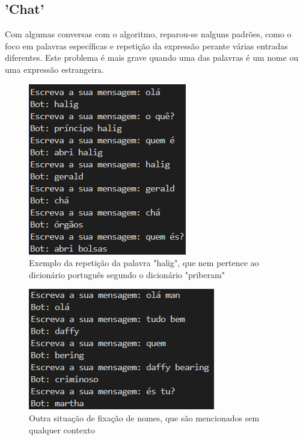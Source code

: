 \documentclass{article}
\begin{document}
\subsection{'Chat'}
Com algumas conversas com o algoritmo, reparou-se nalguns padrões, como o foco em palavras específicas e repetição da expressão perante várias entradas diferentes. Este problema é mais grave quando uma das palavras é um nome ou uma expressão estrangeira. 
\begin{figure}[h]
    \centering
    \includegraphics[scale=0.7]{exemplo_chat.png}
    \caption{Exemplo da repetição da palavra "halig", que nem pertence ao dicionário português segundo o dicionário "priberam"}
    \label{chat1}
\end{figure}
\begin{figure}[h]
    \centering
    \includegraphics[scale=0.7]{chat1}
    \caption{Outra situação de fixação de nomes, que são mencionados sem qualquer contexto}
    \label{chat2}
\end{figure}
\end{document}
